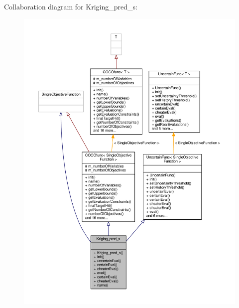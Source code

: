 Collaboration diagram for Kriging\+\_\+pred\+\_\+s\+:
\nopagebreak
\begin{figure}[H]
\begin{center}
\leavevmode
\includegraphics[width=350pt]{classKriging__pred__s__coll__graph}
\end{center}
\end{figure}
